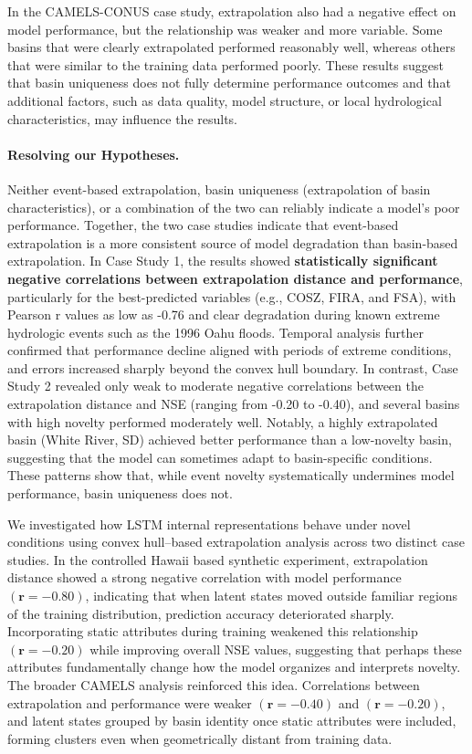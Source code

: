 \documentclass{article}
\begin{document}
In the CAMELS-CONUS case study, extrapolation also had a negative effect on model performance, but the relationship was weaker and more variable. Some basins that were clearly extrapolated performed reasonably well, whereas others that were similar to the training data performed poorly. These results suggest that basin uniqueness does not fully determine performance outcomes and that additional factors, such as data quality, model structure, or local hydrological characteristics, may influence the results.

\paragraph{Resolving our Hypotheses.} Neither event-based extrapolation, basin uniqueness (extrapolation of basin characteristics), or a combination of the two can reliably indicate a model's poor performance. Together, the two case studies indicate that event-based extrapolation is a more consistent source of model degradation than basin-based extrapolation. In Case Study 1, the results showed \textbf{statistically significant negative correlations between extrapolation distance and performance}, particularly for the best-predicted variables (e.g., COSZ, FIRA, and FSA), with Pearson r values as low as -0.76 and clear degradation during known extreme hydrologic events such as the 1996 Oahu floods. Temporal analysis further confirmed that performance decline aligned with periods of extreme conditions, and errors increased sharply beyond the convex hull boundary. In contrast, Case Study 2 revealed only weak to moderate negative correlations between the extrapolation distance and NSE (ranging from -0.20 to -0.40), and several basins with high novelty performed moderately well. Notably, a highly extrapolated basin (White River, SD) achieved better performance than a low-novelty basin, suggesting that the model can sometimes adapt to basin-specific conditions. These patterns show that, while event novelty systematically undermines model performance, basin uniqueness does not.

We investigated how LSTM internal representations behave under novel conditions using convex hull–based extrapolation analysis across two distinct case studies. In the controlled Hawaii based synthetic experiment, extrapolation distance showed a strong negative correlation with model performance $(\mathbf{r = -0.80})$, indicating that when latent states moved outside familiar regions of the training distribution, prediction accuracy deteriorated sharply. Incorporating static attributes during training weakened this relationship $(\mathbf{r = -0.20})$ while improving overall NSE values, suggesting that perhaps these attributes fundamentally change how the model organizes and interprets novelty. The broader CAMELS analysis reinforced this idea. Correlations between extrapolation and performance were weaker $(\mathbf{r = -0.40})$ and $(\mathbf{r = -0.20})$, and latent states grouped by basin identity once static attributes were included, forming clusters even when geometrically distant from training data. 
\end{document}
